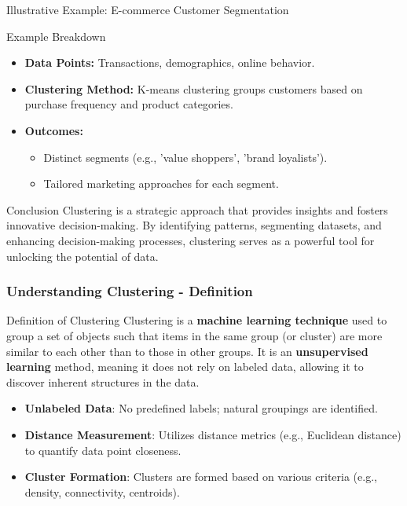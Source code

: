 \documentclass[aspectratio=169]{beamer}
\begin{document}
\begin{frame}[fragile]{Illustrative Example: E-commerce Customer Segmentation}
    \begin{block}{Example Breakdown}
        \begin{itemize}
            \item \textbf{Data Points:} Transactions, demographics, online behavior.
            \item \textbf{Clustering Method:} K-means clustering groups customers based on purchase frequency and product categories.
            \item \textbf{Outcomes:}
            \begin{itemize}
                \item Distinct segments (e.g., 'value shoppers', 'brand loyalists').
                \item Tailored marketing approaches for each segment.
            \end{itemize}
        \end{itemize}
    \end{block}
\end{frame}

\begin{frame}[fragile]{Conclusion}
    Clustering is a strategic approach that provides insights and fosters innovative decision-making. By identifying patterns, segmenting datasets, and enhancing decision-making processes, clustering serves as a powerful tool for unlocking the potential of data.
\end{frame}

\begin{frame}[fragile]
    \frametitle{Understanding Clustering - Definition}
    \begin{block}{Definition of Clustering}
        Clustering is a \textbf{machine learning technique} used to group a set of objects such that items in the same group (or cluster) are more similar to each other than to those in other groups. 
        It is an \textbf{unsupervised learning} method, meaning it does not rely on labeled data, allowing it to discover inherent structures in the data.
    \end{block}
    
    \begin{itemize}
        \item \textbf{Unlabeled Data}: No predefined labels; natural groupings are identified.
        \item \textbf{Distance Measurement}: Utilizes distance metrics (e.g., Euclidean distance) to quantify data point closeness.
        \item \textbf{Cluster Formation}: Clusters are formed based on various criteria (e.g., density, connectivity, centroids).
    \end{itemize}
\end{frame}
\end{document}
